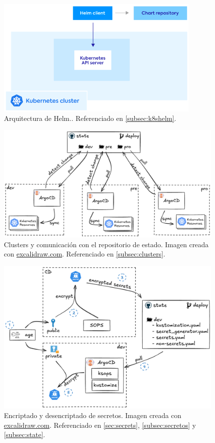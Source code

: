 \begin{figure}[h]
  \centerline{\includegraphics[width=10cm]{figuras/helm}}
  \caption{Arquitectura de Helm.\cite{img:helm}. Referenciado en \ref{subsec:k8shelm}.}
  \label{fig:helm}
\end{figure}

\begin{figure}[h]
  \centerline{\includegraphics[width=15cm]{figuras/clusters}}
  \caption{Clusters y comunicación con el repositorio de estado. Imagen creada con \href{https://excalidraw.com}{excalidraw.com}. Referenciado en \ref{subsec:clusters}.}
  \label{fig:clusters}
\end{figure}

\begin{figure}[h]
  \centerline{\includegraphics[width=13.5cm]{figuras/secrets}}
  \caption{Encriptado y desencriptado de secretos. Imagen creada con \href{https://excalidraw.com}{excalidraw.com}. Referenciado en \ref{sec:secrets}, \ref{subsec:secretos} y \ref{subsec:state}.}
  \label{fig:secrets}
\end{figure}

